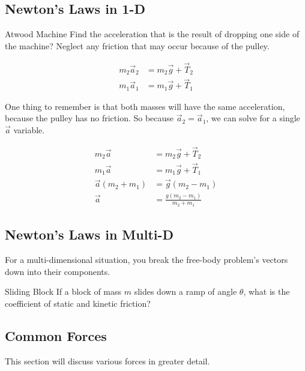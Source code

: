 \subsection{Newton's Laws in 1-D}\label{subsec:Newtons Laws 1-D}
\begin{example}[]{Atwood Machine}
  Find the acceleration that is the result of dropping one side of the machine?
  Neglect any friction that may occur because of the pulley.

  \tcblower

  \begin{align*}
    m_{2} \vec{a}_{2} &= m_{2} \vec{g} + \vec{T}_{2} \\
    m_{1} \vec{a}_{1} &= m_{1} \vec{g} + \vec{T}_{1}
  \end{align*}

  One thing to remember is that both masses will have the same acceleration, because the pulley has no friction.
  So because $\vec{a}_{2} = \vec{a}_{1}$, we can solve for a single $\vec{a}$ variable.

  \begin{align*}
    m_{2} \vec{a} &= m_{2} \vec{g} + \vec{T}_{2} \\
    m_{1} \vec{a} &= m_{1} \vec{g} + \vec{T}_{1} \\
    \vec{a} \left( m_{2} + m_{1} \right) &= \vec{g} \left( m_{2} - m_{1} \right) \\
    \vec{a} &= \frac{g \left( m_{2} - m_{1} \right)}{m_{2}+m_{1}}
  \end{align*}
\end{example}

\subsection{Newton's Laws in Multi-D}\label{subsec:Newtons Laws Multi-D}
For a multi-dimensional situation, you break the free-body problem's vectors down into their components.

\begin{example}[]{Sliding Block}
  If a block of mass $m$ slides down a ramp of angle $\theta$, what is the coefficient of static and kinetic friction?

  \tcblower

\end{example}

\subsection{Common Forces}\label{subsec:Common Forces}
This section will discuss various forces in greater detail.

